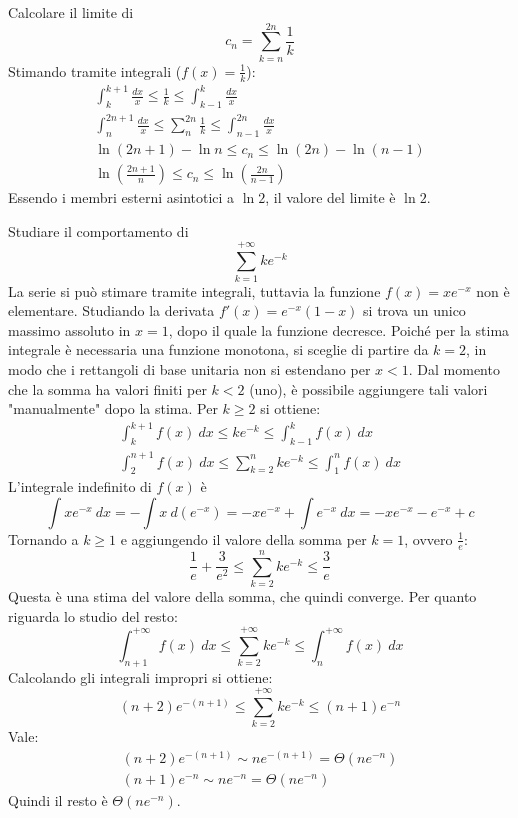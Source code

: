 \begin{examp}
	Calcolare il limite di
	\[
		c_n=\sum_{k=n}^{2n} \frac{1}{k}
	\]
	Stimando tramite integrali ($f(x)=\frac{1}{k}$):
	\begin{gather*}
		\int_k^{k+1}\frac{dx}{x}\leq \frac{1}{k}\leq \int_{k-1}^k \frac{dx}{x}\\
		\int_n^{2n+1}\frac{dx}x \leq \sum_{n}^{2n} \frac{1}{k} \leq \int_{n-1}^{2n} \frac{dx}{x}\\
		\ln(2n+1)-\ln n \leq c_n \leq \ln(2n) -\ln(n-1)\\
		\ln\left(\frac{2n+1}{n}\right) \leq c_n \leq \ln\left(\frac{2n}{n-1}\right)
	\end{gather*}
	Essendo i membri esterni asintotici a $\ln 2$, il valore del limite è $\ln 2$.
\end{examp}

\begin{examp}
	Studiare il comportamento di
	\[
		\sum_{k=1}^{+\infty} ke^{-k}
	\]
	La serie si può stimare tramite integrali, tuttavia la funzione $f(x)=xe^{-x}$ non è elementare. Studiando la derivata $f'(x)=e^{-x}(1-x)$ si trova un unico massimo assoluto in $x=1$, dopo il quale la funzione decresce. Poiché per la stima integrale è necessaria una funzione monotona, si sceglie di partire da $k=2$, in modo che i rettangoli di base unitaria non si estendano per $x<1$. Dal momento che la somma ha valori finiti per $k<2$ (uno), è possibile aggiungere tali valori "manualmente" dopo la stima. Per $k\geq2$ si ottiene:
	\begin{gather*}
		\int_k^{k+1} f(x)~dx \leq ke^{-k} \leq \int_{k-1}^k f(x)~dx\\
		\int_2^{n+1} f(x)~dx \leq \sum_{k=2}^n ke^{-k} \leq \int_1^n f(x)~dx
	\end{gather*}
	L'integrale indefinito di $f(x)$ è
	\[
		\int xe^{-x}~dx=-\int x~d(e^{-x})=-xe^{-x}+\int e^{-x}~dx=-xe^{-x}-e^{-x}+c
	\]
	Tornando a $k\geq1$ e aggiungendo il valore della somma per $k=1$, ovvero $\frac{1}{e}$:
	\[
		\frac{1}{e}+\frac{3}{e^2} \leq \sum_{k=2}^n ke^{-k} \leq \frac{3}{e}
	\]
	Questa è una stima del valore della somma, che quindi converge. Per quanto riguarda lo studio del resto:
	\[
		\int_{n+1}^{+\infty} f(x)~dx \leq \sum_{k=2}^{+\infty} ke^{-k} \leq \int_n^{+\infty} f(x)~dx
	\]
	Calcolando gli integrali impropri si ottiene:
	\[
		(n+2)e^{-(n+1)} \leq \sum_{k=2}^{+\infty} ke^{-k} \leq (n+1)e^{-n}
	\]
	Vale:
	\begin{gather*}
		(n+2)e^{-(n+1)}\sim ne^{-(n+1)}=\Theta(ne^{-n})\\
		(n+1)e^{-n}\sim ne^{-n}=\Theta(ne^{-n})
	\end{gather*}
	Quindi il resto è $\Theta(ne^{-n})$.
\end{examp}


